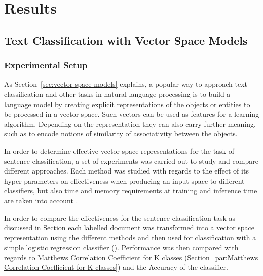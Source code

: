 



\clearpage

\section{Results}
\label{sec:Results}

\subsection{Text Classification with Vector Space Models}
\label{Text Classification with Vector Space Models}

\subsubsection{Experimental Setup}
\label{subs:Experimental Setup}



As Section~\ref{sec:vector-space-models} explains, a popular way to approach text classification and other tasks in natural language processing is to build a language model by creating explicit representations of the objects or entities to be processed in a vector space. Such vectors can be used as features for a learning algorithm. Depending on the representation they can also carry further meaning, such as to encode notions of similarity of associativity between the objects.

In order to determine effective vector space representations for the task of sentence classification, a set of experiments was carried out to study and compare different approaches. Each method was studied with regards to the effect of its hyper-parameters on effectiveness when producing an input space to different classifiers, but also time and memory requirements at training and inference time are taken into account .

In order to compare the effectiveness for the sentence classification task as discussed in Section each labelled document was transformed into a vector space representation using the different methods and then used for classification with a simple logistic regression classifier (). Performance was then compared with regards to Matthews Correlation Coefficient for K classes (Section~\ref{par:Matthews Correlation Coefficient for K classes}) and the Accuracy  of the classifier.

